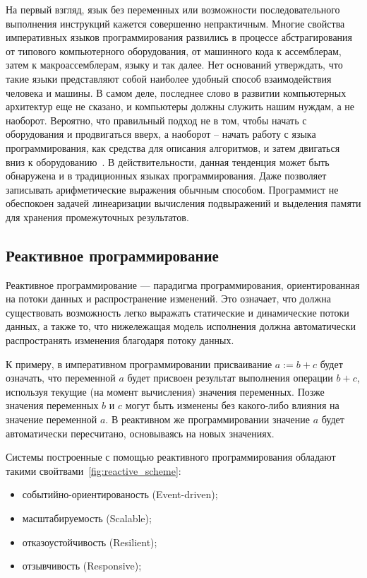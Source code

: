 На первый взгляд, язык без переменных или возможности последовательного выполнения инструкций кажется совершенно непрактичным. Многие свойства императивных языков программирования развились в процессе абстрагирования от типового компьютерного оборудования, от машинного кода к ассемблерам, затем к макроассемблерам, языку \cpp{} и так далее. Нет оснований утверждать, что такие языки представляют собой наиболее удобный способ взаимодействия человека и машины. В самом деле, последнее слово в развитии компьютерных архитектур еще не сказано, и компьютеры должны служить нашим нуждам, а не наоборот. Вероятно, что правильный подход не в том, чтобы начать с оборудования и продвигаться вверх, а наоборот – начать работу с языка программирования, как средства для описания алгоритмов, и затем двигаться вниз к оборудованию~\cite{dijkstra}. В действительности, данная тенденция может быть обнаружена и в традиционных языках программирования. Даже \cpp{} позволяет записывать арифметические выражения обычным способом. Программист не обеспокоен задачей линеаризации вычисления подвыражений и выделения памяти для хранения промежуточных результатов.

\subsection{Реактивное программирование}
\label{sub:domain:reactive_programming}

Реактивное программирование --- парадигма программирования, ориентированная на потоки данных и распространение изменений. Это означает, что должна существовать возможность легко выражать статические и динамические потоки данных, а также то, что нижележащая модель исполнения должна автоматически распространять изменения благодаря потоку данных.

К примеру, в императивном программировании присваивание $a := b + c$ будет означать, что переменной $a$ будет присвоен результат выполнения операции $b + c$, используя текущие (на момент вычисления) значения переменных. Позже значения переменных $b$ и $c$ могут быть изменены без какого-либо влияния на значение переменной $a$. В реактивном же программировании значение $a$ будет автоматически пересчитано, основываясь на новых значениях.

Системы построенные с помощью реактивного программирования обладают такими свойтвами~\ref{fig:reactive_scheme}:

\begin{itemize}
  \item событийно-ориентированость (Event-driven);
  \item масштабируемость (Scalable);
  \item отказоустойчивость (Resilient);
  \item отзывчивость (Responsive);
\end{itemize}

